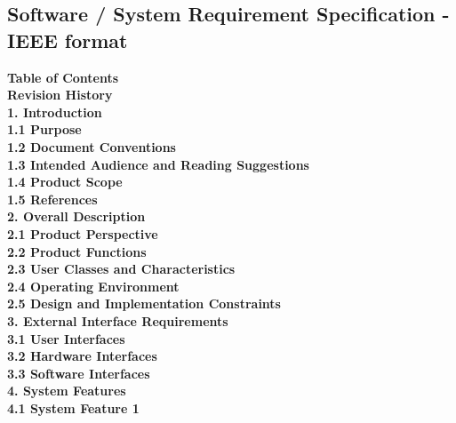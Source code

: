 \subsection{Software / System Requirement Specification - IEEE format}
\textbf{Table of Contents}\\
\textbf{Revision History}\\
\textbf{1.\hspace{0.3cm}	Introduction}\\
\textbf{1.1\hspace{0.3cm} Purpose}\\
\textbf{1.2 \hspace{0.3cm} Document Conventions}\\
\textbf{1.3 \hspace{0.3cm} Intended Audience and Reading Suggestions}\\
\textbf{1.4 \hspace{0.3cm} Product Scope}\\
\textbf{1.5 \hspace{0.3cm} References}\\
\textbf{2.\hspace{0.3cm}	Overall Description}\\
\textbf{2.1	\hspace{0.3cm}Product Perspective}\\
\textbf{2.2\hspace{0.3cm}	Product Functions}\\
\textbf{2.3	\hspace{0.3cm}User Classes and Characteristics}\\
\textbf{2.4	\hspace{0.3cm}Operating Environment}\\
\textbf{2.5\hspace{0.3cm}	Design and Implementation Constraints}\\
\textbf{3.	\hspace{0.3cm}External Interface Requirements}\\
\textbf{3.1	\hspace{0.3cm}User Interfaces}\\
\textbf{3.2	\hspace{0.3cm}Hardware Interfaces}\\
\textbf{3.3	\hspace{0.3cm}Software Interfaces}\\
\textbf{4.\hspace{0.3cm}	System Features}\\
\textbf{4.1	\hspace{0.3cm}System Feature 1}\\
